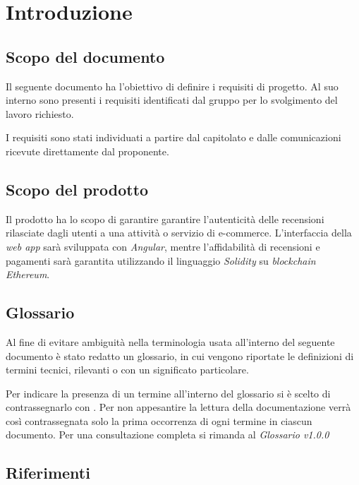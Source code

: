 \section{Introduzione}


\subsection{Scopo del documento}
Il seguente documento ha l'obiettivo di definire i requisiti di progetto. Al suo interno sono presenti i requisiti
identificati dal gruppo \groupName\: per lo svolgimento del lavoro richiesto.

I requisiti sono stati individuati a partire dal capitolato \capName
e dalle comunicazioni ricevute direttamente dal proponente.

\subsection{Scopo del prodotto}
Il prodotto ha lo scopo di garantire garantire l'autenticità
delle recensioni rilasciate dagli utenti a una attività o servizio di e-commerce. L'interfaccia della \textit{web app}\glo \: sarà
sviluppata con \textit{Angular}\glo \:, mentre l'affidabilità di recensioni e pagamenti sarà garantita utilizzando il linguaggio \textit{Solidity}\glo \: su \textit{blockchain}\glo \: \textit{Ethereum}\glo \:.


\subsection{Glossario}
Al fine di evitare ambiguità nella terminologia usata all'interno del seguente
documento è stato redatto un glossario, in cui vengono riportate le definizioni
di termini tecnici, rilevanti o con un significato particolare.

Per indicare
la presenza di un termine all'interno del glossario si è scelto di
contrassegnarlo con \glo . Per non appesantire la lettura della documentazione
verrà così contrassegnata solo la prima occorrenza di ogni termine in ciascun
documento.
Per una consultazione completa si rimanda al \textit{Glossario v1.0.0}

\subsection{Riferimenti}
